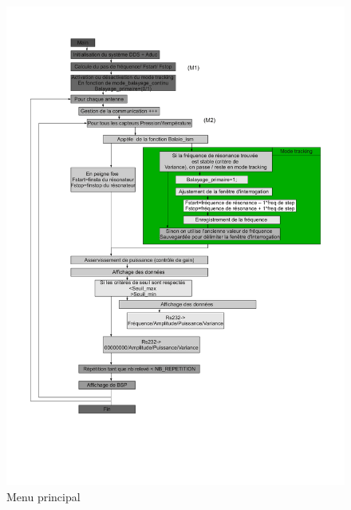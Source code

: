 \documentclass[a4paper]{article}
\begin{document}
\begin{figure}[h!tb]
\includegraphics[width=\linewidth]{algo}
\caption{Menu principal}
\label{hw1}
\end{figure}
\end{document}

